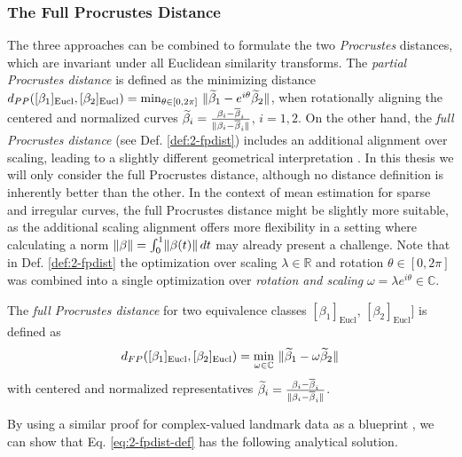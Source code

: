 \subsubsection*{The Full Procrustes Distance}
The three approaches can be combined to formulate the two \emph{Procrustes} distances, which are invariant under all Euclidean similarity transforms.
The \emph{partial Procrustes distance} is defined as the minimizing distance $d_{PP}([\beta_1]_\text{Eucl}, [\beta_2]_\text{Eucl}) = \min_{\theta \in [0,2\pi]} \,\, \lVert\widetilde\beta_1 - e^{i\theta} \widetilde\beta_2\rVert$, when rotationally aligning the centered and normalized curves $\widetilde\beta_i= \frac{\beta_i - \overline\beta_i}{\lVert\beta_i - \overline\beta_i\rVert}$, $i=1,2$.
On the other hand, the \emph{full Procrustes distance} (see Def. \ref{def:2-fpdist}) includes an additional alignment over scaling, leading to a slightly different geometrical interpretation \parencite[see][77-78]{DrydenMardia2016}.
In this thesis we will only consider the full Procrustes distance, although no distance definition is inherently better than the other.
In the context of mean estimation for sparse and irregular curves, the full Procrustes distance might be slightly more suitable, as the additional scaling alignment offers more flexibility in a setting where calculating a norm $\lVert\beta\rVert = \int_0^1 \lVert\beta(t)\rVert\, dt$ may already present a challenge.
Note that in Def. \ref{def:2-fpdist} the optimization over scaling $\lambda \in \mathbb{R}$ and rotation $\theta \in [0,2\pi]$ was combined into a single optimization over \emph{rotation and scaling} $\omega = \lambda e^{i\theta} \in \mathbb{C}$.
\begin{definition}
  \label{def:2-fpdist}
  The \emph{full Procrustes distance} for two equivalence classes $[\beta_1]_\text{Eucl}$, $[\beta_2]_\text{Eucl}]$ is defined as
  \begin{equation}
    \label{eq:2-fpdist-def}
    d_{FP}([\beta_1]_\text{Eucl}, [\beta_2]_\text{Eucl}) = \min_{\omega \in \mathbb{C}} \,\, \lVert\widetilde\beta_1 - \omega \widetilde\beta_2\rVert
  \end{equation}
  with centered and normalized representatives $\widetilde\beta_i = \frac{\beta_i - \overline\beta_i}{\lVert\beta_i - \overline\beta_i\rVert}$.
\end{definition}

\noindent By using a similar proof for complex-valued landmark data as a blueprint \parencite[see][Chap~8]{DrydenMardia2016}, we can show that Eq. \ref{eq:2-fpdist-def} has the following analytical solution.

